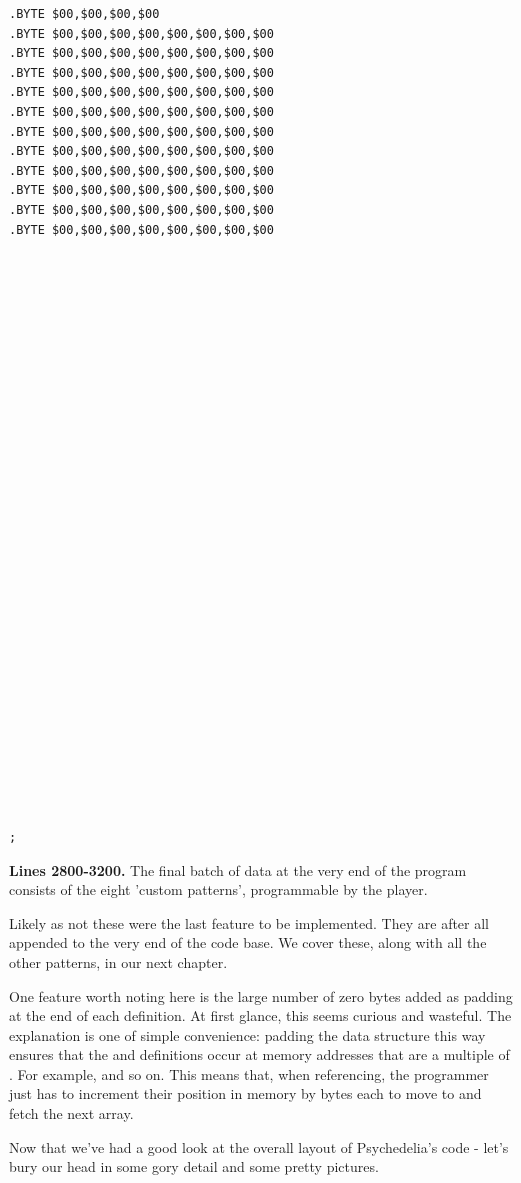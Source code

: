 \begin{minipage}[b]{0.33\linewidth}
\begin{lrbox}{\mybox}
\begin{lstlisting}[basicstyle=\ttfamily\tiny,escapechar=\%]
.BYTE $00,$00,$00,$00
.BYTE $00,$00,$00,$00,$00,$00,$00,$00
.BYTE $00,$00,$00,$00,$00,$00,$00,$00
.BYTE $00,$00,$00,$00,$00,$00,$00,$00
.BYTE $00,$00,$00,$00,$00,$00,$00,$00
.BYTE $00,$00,$00,$00,$00,$00,$00,$00
.BYTE $00,$00,$00,$00,$00,$00,$00,$00
.BYTE $00,$00,$00,$00,$00,$00,$00,$00
.BYTE $00,$00,$00,$00,$00,$00,$00,$00
.BYTE $00,$00,$00,$00,$00,$00,$00,$00
.BYTE $00,$00,$00,$00,$00,$00,$00,$00
.BYTE $00,$00,$00,$00,$00,$00,$00,$00






























;
\end{lstlisting}
\end{lrbox}%
\scalebox{0.8}{\usebox{\mybox}}
\end{minipage}
\textbf{Lines 2800-3200.} The final batch of data at the very end of the program consists of the
eight 'custom patterns', programmable by the player.

Likely as not these were the last feature to be implemented. They are after all appended to the very
end of the code base. We cover these, along with all the other patterns, in our next chapter. 

One feature worth noting here is the large number of zero bytes added as padding at the end of each 
definition. At first glance, this seems curious and wasteful. The explanation is one of simple convenience:
padding the data structure this way ensures that the  and  definitions occur at memory
addresses that are a multiple of . For example,  and so on.
This means that, when referencing, the programmer just
has to increment their position in memory by  bytes each to move to and fetch the next array.

Now that we've had a good look at the overall layout of Psychedelia's code - let's bury our head in some gory detail
and some pretty pictures.
\vfill


